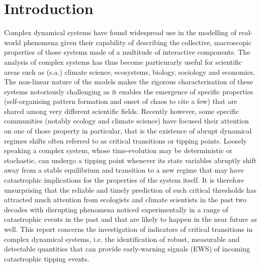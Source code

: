 \documentclass[../main.tex]{subfiles}
\begin{document}
\section{Introduction}\label{sec1}
Complex dynamical systems have found widespread use in the modelling of real-world phenomena given their capability of describing the collective, macroscopic properties of those systems made of a multitude of interactive components.
The analysis of complex systems has thus become particurarly useful for scientific areas such as (s.a.) climate science, ecosystems, biology, sociology and economics.
The non-linear nature of the models makes the rigorous characterisation of these systems notoriously challenging as it enables the emergence of specific properties (self-organising pattern formation and onset of chaos to cite a few) that are shared among very different scientific fields.
Recently however, some specific communities (notably ecology and climate science) have focused their attention on one of those property in particular, that is the existence of abrupt dynamical regimes shifts often referred to as critical transitions or tipping points.
Loosely speaking a complex system, whose time-evolution may be deterministic or stochastic, can undergo a tipping point whenever its state variables abruptly shift away from a stable equilibrium and transition to a new regime that may have catastrophic implications for the properties of the system itself.
It is therefore unsurprising that the reliable and timely prediction of such critical thresholds has attracted much attention from ecologists and climate scientists in the past two decades with disrupting phenomena noticed experimentally in a range of catastrophic events in the past and that are likely to happen in the near future as well.
This report concerns the investigation of indicators of critical transitions in complex dynamical systems, i.e. the identification of robust, measurable and detectable quantities that can provide early-warning signals (EWS) of incoming catastrophic tipping events.
\end{document}
